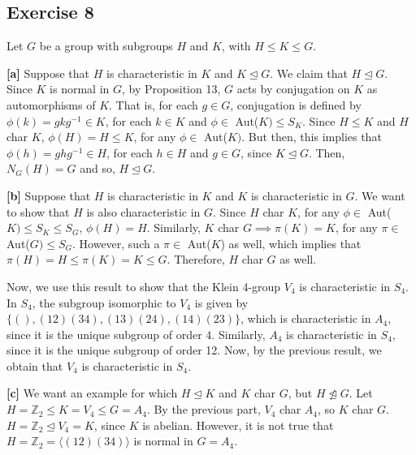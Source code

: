 \subsection*{Exercise 8}
Let $G$ be a group with subgroups $H$ and $K$, with $H \le K \le G$.

\textbf{[a]} Suppose that $H$ is characteristic in $K$ and $K \trianglelefteq G$. We claim that $H \trianglelefteq G$. Since $K$ is normal in $G$, by Proposition 13, $G$ acts by conjugation on $K$ as automorphisms of $K$. That is, for each $g \in G$, conjugation is defined by $\phi(k) = gkg^{-1} \in K$, for each $k \in K$ and $\phi \in$ Aut($K) \le S_K$. Since $H \le K$ and $H$ char $K$, $\phi(H) = H \le K$, for any $\phi \in$ Aut($K)$. But then, this implies that $\phi(h) = ghg^{-1} \in H$, for each $h \in H$ and $g \in G$, since $K \trianglelefteq G$. Then, $N_G(H) = G$ and so, $H \trianglelefteq G$.

\textbf{[b]} Suppose that $H$ is characteristic in $K$ and $K$ is characteristic in $G$. We want to show that $H$ is also characteristic in $G$. Since $H$ char $K$, for any $\phi \in$ Aut($K) \le S_K \le S_G$, $\phi(H) = H$. Similarly, $K$ char $G \implies \pi(K) = K$, for any $\pi \in$ Aut($G) \le S_G$. However, such a $\pi \in$ Aut($K$) as well, which implies that $\pi(H) = H \le \pi(K) = K \le G$. Therefore, $H$ char $G$ as well.

Now, we use this result to show that the Klein 4-group $V_4$ is characteristic in $S_4$. In $S_4$, the subgroup isomorphic to $V_4$ is given by $\{(),(12)(34),(13)(24),(14)(23)\}$, which is characteristic in $A_4$, since it is the unique subgroup of order 4. Similarly, $A_4$ is characteristic in $S_4$, since it is the unique subgroup of order 12. Now, by the previous result, we obtain that $V_4$ is characteristic in $S_4$.

\textbf{[c]} We want an example for which $H \trianglelefteq K$ and $K$ char $G$, but $H \not\trianglelefteq G$. Let $H = \mathbb{Z}_2 \le K = V_4 \le G = A_4$. By the previous part, $V_4$ char $A_4$, so $K$ char $G$. $H = \mathbb{Z}_2 \trianglelefteq V_4 = K$, since $K$ is abelian. However, it is not true that $H = \mathbb{Z}_2 = \langle (12)(34) \rangle$ is normal in $G = A_4$.
